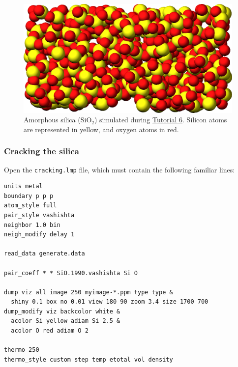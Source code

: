 \documentclass[9pt,tutorial]{livecoms}
\newcommand{\flecmd}[1]{\textcolor{command}{\texttt{#1}}} %
\begin{document}
\begin{figure}
\centering
\includegraphics[width=0.9\linewidth]{GCMC-generate}
\caption{Amorphous silica ($\text{SiO}_2$) simulated
during \hyperref[gcmc-silica-label]{Tutorial 6}.  Silicon atoms are
represented in yellow, and oxygen atoms in red.}
\label{fig:GCMC-snapshot}
\end{figure}

\subsubsection{Cracking the silica}

Open the \flecmd{cracking.lmp} file, which must contain the following familiar lines:
\begin{lstlisting}
units metal
boundary p p p
atom_style full
pair_style vashishta
neighbor 1.0 bin
neigh_modify delay 1

read_data generate.data

pair_coeff * * SiO.1990.vashishta Si O

dump viz all image 250 myimage-*.ppm type type &
  shiny 0.1 box no 0.01 view 180 90 zoom 3.4 size 1700 700
dump_modify viz backcolor white &
  acolor Si yellow adiam Si 2.5 &
  acolor O red adiam O 2

thermo 250
thermo_style custom step temp etotal vol density
\end{lstlisting}
\end{document}
